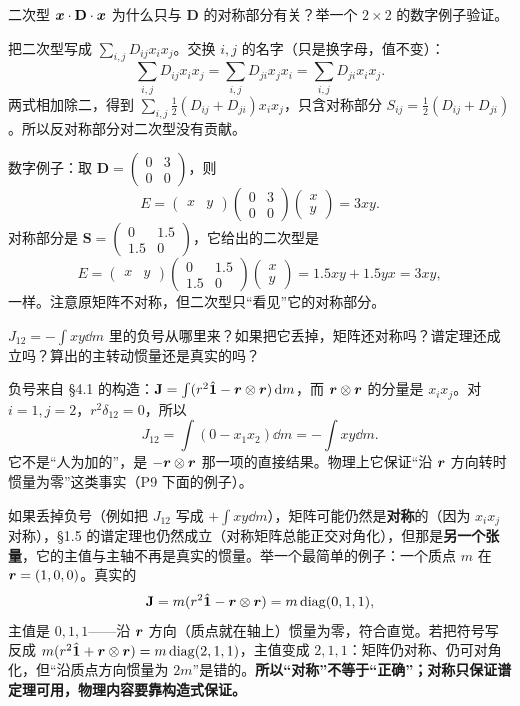\documentclass[11pt]{ctexart}
\newcommand{\ten}[1]{\mathbf{#1}}
\newcommand{\unitd}{\hat{\ten{1}}}
\begin{document}
{二次型 $\vect x\cdot\ten D\cdot\vect x$ 为什么只与 $\ten D$ 的对称部分有关？举一个 $2\times2$ 的数字例子验证。}

把二次型写成 $\sum_{i,j}D_{ij}x_ix_j$。交换 $i,j$ 的名字（只是换字母，值不变）：
\[
\sum_{i,j}D_{ij}x_ix_j=\sum_{i,j}D_{ji}x_jx_i=\sum_{i,j}D_{ji}x_ix_j .
\]
两式相加除二，得到 $\sum_{i,j}\tfrac12(D_{ij}+D_{ji})x_ix_j$，只含对称部分 $S_{ij}=\tfrac12(D_{ij}+D_{ji})$。所以反对称部分对二次型没有贡献。

数字例子：取 $\ten D=\begin{pmatrix}0&3\\0&0\end{pmatrix}$，则
\[
E=\begin{pmatrix}x&y\end{pmatrix}\begin{pmatrix}0&3\\0&0\end{pmatrix}\begin{pmatrix}x\\y\end{pmatrix}=3xy .
\]
对称部分是 $\ten S=\begin{pmatrix}0&1.5\\1.5&0\end{pmatrix}$，它给出的二次型是
\[
E=\begin{pmatrix}x&y\end{pmatrix}\begin{pmatrix}0&1.5\\1.5&0\end{pmatrix}\begin{pmatrix}x\\y\end{pmatrix}=1.5xy+1.5yx=3xy,
\]
一样。注意原矩阵不对称，但二次型只“看见”它的对称部分。

{$J_{12}=-\int xy\dd m$ 里的负号从哪里来？如果把它丢掉，矩阵还对称吗？谱定理还成立吗？算出的主转动惯量还是真实的吗？}

负号来自 §4.1 的构造：$\ten J=\int(r^2\unitd-\vect r\otimes\vect r)\dd m$，而 $\boldsymbol{r}\otimes\boldsymbol{r}$ 的分量是 $x_ix_j$。对 $i=1,j=2$，$r^2\delta_{12}=0$，所以
\[
J_{12}=\int(0-x_1x_2)\dd m=-\int xy\dd m .
\]
它不是“人为加的”，是 $-\boldsymbol{r}\otimes\boldsymbol{r}$ 那一项的直接结果。物理上它保证“沿 $\boldsymbol{r}$ 方向转时惯量为零”这类事实（P9 下面的例子）。

如果丢掉负号（例如把 $J_{12}$ 写成 $+\int xy\dd m$），矩阵可能仍然是\textbf{对称}的（因为 $x_ix_j$ 对称），§1.5 的谱定理也仍然成立（对称矩阵总能正交对角化），但那是\textbf{另一个张量}，它的主值与主轴不再是真实的惯量。举一个最简单的例子：一个质点 $m$ 在 $\boldsymbol{r}=(1,0,0)$。真实的
\[
\ten J=m(r^2\unitd-\vect r\otimes\vect r)=m\operatorname{diag}(0,1,1),
\]
主值是 $0,1,1$——沿 $\boldsymbol{r}$ 方向（质点就在轴上）惯量为零，符合直觉。若把符号写反成 $m(r^2\unitd+\vect r\otimes\vect r)=m\operatorname{diag}(2,1,1)$，主值变成 $2,1,1$：矩阵仍对称、仍可对角化，但“沿质点方向惯量为 $2m$”是错的。\textbf{所以“对称”不等于“正确”；对称只保证谱定理可用，物理内容要靠构造式保证。}
\end{document}
